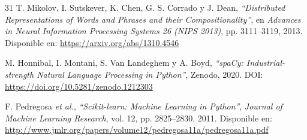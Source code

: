 \begin{thebibliography}{31}
T. Mikolov, I. Sutskever, K. Chen, G. S. Corrado y J. Dean, \textit{``Distributed Representations of Words and Phrases and their Compositionality''}, en \textit{Advances in Neural Information Processing Systems 26 (NIPS 2013)}, pp. 3111--3119, 2013. Disponible en: \url{https://arxiv.org/abs/1310.4546}
 
M. Honnibal, I. Montani, S. Van Landeghem y A. Boyd, \textit{``spaCy: Industrial-strength Natural Language Processing in Python''}, Zenodo, 2020. DOI: \url{https://doi.org/10.5281/zenodo.1212303}
 
F. Pedregosa \textit{et al.}, \textit{``Scikit-learn: Machine Learning in Python''}, \textit{Journal of Machine Learning Research}, vol. 12, pp. 2825--2830, 2011. Disponible en: \url{http://www.jmlr.org/papers/volume12/pedregosa11a/pedregosa11a.pdf}


\end{thebibliography}